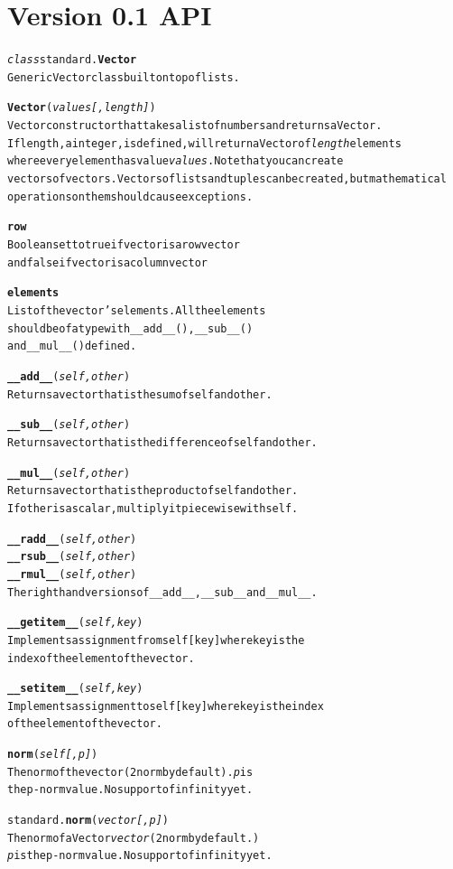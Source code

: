\documentclass{book}
\begin{document}
\section{Version 0.1 API}
\begin{alltt}
\emph{class} standard.\textbf{Vector }
    Generic Vector class built on top of lists.

    \textbf{Vector}( \emph{values [,length] } )
       Vector constructor that takes a list of numbers and returns a Vector.
       If length, a integer, is defined, will return a Vector of \emph{length} elements
       where every element has value \emph{values}. Note that you can create
       vectors of vectors. Vectors of lists and tuples can be created, but mathematical
       operations on them should cause exceptions.

    \textbf{row}
        Boolean set to true if vector is a row vector 
        and false if vector is a column vector

    \textbf{elements}
         List of the vector's elements. All the elements
         should be of a type with  __add__(), __sub__() 
         and __mul__() defined.

    \textbf{__add__}( \emph{ self, other} )
         Returns a vector that is the sum of self and other.

    \textbf{__sub__}( \emph{ self, other} )
         Returns a vector that is the difference of self and other.

    \textbf{__mul__}( \emph{ self, other} )
         Returns a vector that is the product of self and other.
         If other is a scalar, multiply it piecewise with self.

    \textbf{__radd__}( \emph{ self, other} )
    \textbf{__rsub__}( \emph{ self, other} )
    \textbf{__rmul__}( \emph{ self, other} )
        The right hand versions of __add__, __sub__ and __mul__.

    \textbf{__getitem__}( \emph{ self, key} )
        Implements assignment from self[key] where key is the 
        index of the element of the vector.

    \textbf{__setitem__}( \emph{ self, key} )
        Implements assignment to self[key] where key is the index 
        of the element of the vector.

    \textbf{norm}(\emph{self[,p]})
        The norm of the vector (2 norm by default). \emph{p} is
         the p-norm value. No support of infinity yet.

standard.\textbf{norm}(\emph{ vector[,p]})
    The norm of a Vector \emph{vector} (2 norm by default.)
    \emph{p} is the p-norm value. No support of infinity yet.


\end{alltt}
\end{document}
